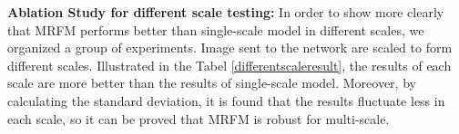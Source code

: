 \documentclass[final]{cvpr}
\begin{document}
\begin{table}[t]
\begin{center}
\end{center}
\caption{Ablation Study for the each module.}
\label{Ablation Study for the each module}
\end{table}




\textbf{Ablation Study for different scale testing:} In order to show more clearly that MRFM performs better than single-scale model in different scales, we organized a group of experiments. Image sent to the network are scaled to form different scales. Illustrated in the Tabel \ref{differentscaleresult}, the results of each scale are more better than the results of single-scale model. Moreover, by calculating the standard deviation, it is found that the results fluctuate less in each scale, so it can be proved that MRFM is robust for multi-scale.
\end{document}
